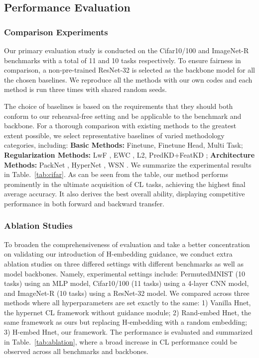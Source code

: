 \subsection{Performance Evaluation}

\subsubsection{Comparison Experiments}

Our primary evaluation study is conducted on the Cifar10/100 and ImageNet-R benchmarks with a total of 11 and 10 tasks respectively. To ensure fairness in comparison, a non-pre-trained ResNet-32 \citep{he2016deep} is selected as the backbone model for all the chosen baselines. We reproduce all the methods with our own codes and each method is run three times with shared random seeds.

The choice of baselines is based on the requirements that they should both conform to our rehearsal-free setting and be applicable to the benchmark and backbone. For a thorough comparison with existing methods to the greatest extent possible, we select representative baselines of varied methodology categories, including: \textbf{Basic Methods:} Finetune, Finetune Head, Multi Task; \textbf{Regularization Methods:} LwF \citep{li2017learning}, EWC \citep{kirkpatrick2017overcoming}, L2, PredKD+FeatKD \citep{smith2023closer};
\textbf{Architecture Methods:} PackNet \citep{mallya2018packnet}, HyperNet \citep{von2020continual}, WSN \citep{kang2022forget}. We summarize the experimental results in Table.~\ref{tab:cifar}. As can be seen from the table, our method performs prominently in the ultimate acquisition of CL tasks, achieving the highest final average accuracy. It also derives the best overall ability, displaying competitive performance in both forward and backward transfer.  


\subsubsection{Ablation Studies}

To broaden the comprehensiveness of evaluation and take a better concentration on validating our introduction of H-embedding guidance, we conduct extra ablation studies on three differed settings with different benchmarks as well as model backbones. Namely, experimental settings include: PermutedMNIST (10 tasks) using an MLP model, Cifar10/100 (11 tasks) using a 4-layer CNN model, and ImageNet-R (10 tasks) using a ResNet-32 model. We compared across three methods where all hyperparameters are set exactly to the same: 1) Vanilla Hnet, the hypernet CL framework without guidance module; 2) Rand-embed Hnet, the same framework as ours but replacing H-embedding with a random embedding; 3) H-embed Hnet, our framework. The performance is evaluated and summarized in Table.~\ref{tab:ablation}, where a broad increase in CL performance could be observed across all benchmarks and backbones.

